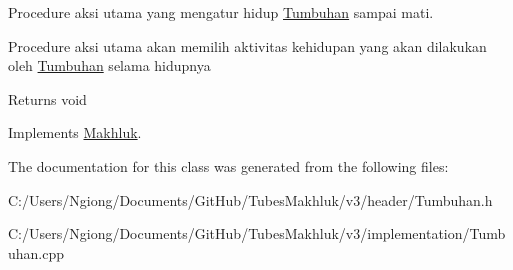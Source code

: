 Procedure aksi utama yang mengatur hidup \hyperlink{class_tumbuhan}{Tumbuhan} sampai mati. 

Procedure aksi utama akan memilih aktivitas kehidupan yang akan dilakukan oleh \hyperlink{class_tumbuhan}{Tumbuhan} selama hidupnya \begin{DoxyReturn}{Returns}
void 
\end{DoxyReturn}


Implements \hyperlink{class_makhluk_af0cc274cef5058743f6b048a78843bd1}{Makhluk}.



The documentation for this class was generated from the following files\+:\begin{DoxyCompactItemize}
\item 
C\+:/\+Users/\+Ngiong/\+Documents/\+Git\+Hub/\+Tubes\+Makhluk/v3/header/Tumbuhan.\+h\item 
C\+:/\+Users/\+Ngiong/\+Documents/\+Git\+Hub/\+Tubes\+Makhluk/v3/implementation/Tumbuhan.\+cpp\end{DoxyCompactItemize}
